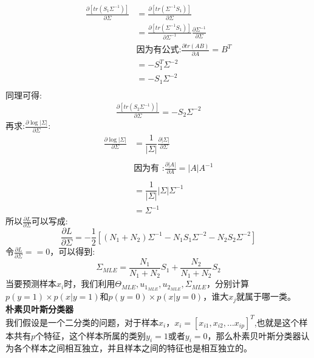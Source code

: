 \documentclass[withoutpreface,bwprint]{cumcmthesis} %
\begin{document}
	\begin{align*}
		\frac{\partial \left[ tr(S_1\Sigma^{-1} ) \right]}{\partial \Sigma} 
		& =\frac{\partial \left[ tr(\Sigma^{-1}S_1 ) \right]}{\partial \Sigma}\\
		&=\frac{\partial \left[ tr(\Sigma^{-1}S_1 ) \right]}{\partial \Sigma^{-1}} \frac{\partial \Sigma^{-1}}{\partial \Sigma} \\
		&	\textbf{因为有公式:} \frac{\partial tr(AB)}{\partial A}=B^T\\
		&=-S_1^T\Sigma^{-2}\\
		&=-S_1\Sigma^{-2}\\
	\end{align*}
	同理可得:
	\begin{align*}
		\frac{\partial \left[ tr(S_2\Sigma^{-1} ) \right]}{\partial \Sigma}= -S_2\Sigma^{-2}
	\end{align*}
	再求:$\frac{\partial \log |\Sigma|}{\partial \Sigma}$:
	\begin{align*}
		\frac{\partial \log |\Sigma|}{\partial \Sigma}
		&=\dfrac{1}{|\Sigma|} \frac{\partial |\Sigma|}{\partial \Sigma}\\\\
		& \textbf{因为有 :}\frac{\partial |A|}{\partial A}=|A|A^{-1}\\\\
		&=\dfrac{1}{|\Sigma|} |\Sigma| \Sigma^{-1} \\
		&=\Sigma^{-1}
	\end{align*}
	所以$\frac{\partial L}{\partial \Sigma}$可以写成:
	\begin{equation}
		\frac{\partial L}{\partial \Sigma}=-\dfrac{1}{2}\left[ (N_1+N_2)\Sigma^{-1} -N_1S_1\Sigma^{-2} -N_2S_2\Sigma^{-2}\right]
	\end{equation}
	令$\frac{\partial L}{\partial \Sigma}==0$，可以得到:
	\begin{equation}
		\Sigma_{MLE}=\dfrac{N_1}{N_1+N_2}S_1+\dfrac{N_2}{N_1+N_2}S_2
	\end{equation}
	当要预测样本$x_i$时，我们利用$ \Theta_{MLE} ,u_{1_{MLE}} ,u_{2_{MLE}}  ,\Sigma_{MLE}$，分别计算$p(y=1) \times p(x|y=1)$和$p(y=0) \times p(x|y=0)$，谁大$x_j$就属于哪一类。
	\\ \textbf{朴素贝叶斯分类器}\\
	我们假设是一个二分类的问题，对于样本$x_i$，$x_i=\left[ x_{i1},x_{i2},\ldots x_{ip}\right]^T$,也就是这个样本共有$p$个特征，这个样本所属的类别$y_i=1$或者$y_i=0$，那么朴素贝叶斯分类器认为各个样本之间相互独立，并且样本之间的特征也是相互独立的。\\
\end{document}
